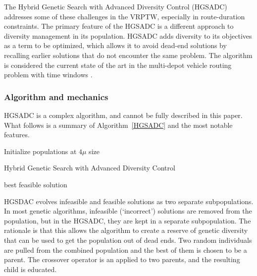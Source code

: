 \documentclass{sig-alternate}
\begin{document}
The Hybrid Genetic Search with Advanced Diversity Control (HGSADC) addresses some of these challenges in the VRPTW, especially in route-duration constraints. The primary feature of the HGSADC is a different approach to diversity management in its population. HGSADC adds diversity to its objectives as a term to be optimized, which allows it to avoid dead-end solutions by recalling earlier solutions that do not encounter the same problem. The algorithm is considered the current state of the art in the multi-depot vehicle routing problem with time windows \cite{Vidal:2013}.

\subsubsection{Algorithm and mechanics}
HGSADC is a complex algorithm, and cannot be fully described in this paper. What follows is a summary of Algorithm~\ref{HGSADC} and the most notable features.

\begin{algorithm}[t]
Initialize populations at $4\mu$ size\;
\caption{Hybrid Genetic Search with Advanced Diversity Control\label{HGSADC}}
\Return best feasible solution\;
\end{algorithm}

HGSDAC evolves infeasible and feasible solutions as two separate subpopulations. In most genetic algorithms, infeasible (`incorrect') solutions are removed from the population, but in the HGSADC, they are kept in a separate subpopulation. The rationale is that this allows the algorithm to create a reserve of genetic diversity that can be used to get the population out of dead ends. Two random individuals are pulled from the combined population and the best of them is chosen to be a parent. The crossover operator is an applied to two parents, and the resulting child is educated.
\end{document}
